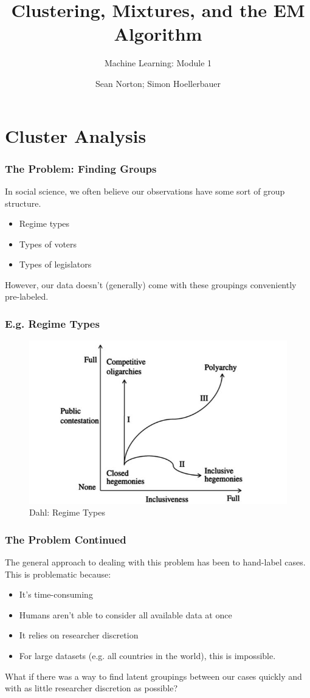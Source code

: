 \documentclass{beamer}
\title{Clustering, Mixtures, and the EM Algorithm}
\subtitle{Machine Learning: Module 1}
\author{Sean Norton; Simon Hoellerbauer}
\begin{document}
\begin{frame}
	\titlepage
\end{frame}

\section{Cluster Analysis}

\begin{frame}
\frametitle{The Problem: Finding Groups}
	In social science, we often believe our observations have some sort of group structure.
	\begin{itemize}
		\item Regime types
		\item Types of voters
		\item Types of legislators		
	\end{itemize}
	However, our data doesn't (generally) come with these groupings conveniently pre-labeled.

\end{frame}

\begin{frame}
\frametitle{E.g. Regime Types}
	
	\begin{figure}
		\centering
		\includegraphics[width=0.7\linewidth]{dahl}
		\caption{Dahl: Regime Types}
		\label{fig:dahl}
	\end{figure}

\end{frame}

\begin{frame}
\frametitle{The Problem Continued}
	The general approach to dealing with this problem has been to hand-label cases. This is problematic because:
	\begin{itemize}
		\item It's time-consuming
		\item Humans aren't able to consider all available data at once
		\item It relies on researcher discretion
		\item For large datasets (e.g. all countries in the world), this is impossible.
	\end{itemize}
	What if there was a way to find latent groupings between our cases quickly and with as little researcher discretion as possible?
\end{frame}
\end{document}
